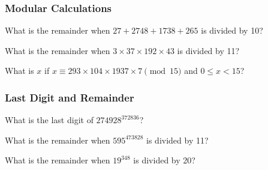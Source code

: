 			\subsubsection{Modular Calculations}
				\begin{problem} What is the remainder when $27+2748+1738+265$ is divided by 10? \end{problem}\vspace{0.5in}
				\begin{problem} What is the remainder when $3 \times 37 \times 192 \times 43$ is divided by 11? \end{problem}\vspace{0.5in}
				\begin{problem} What is $x$ if $x \equiv 293 \times 104 \times 1937 \times 7 \pmod{15}$ and $0 \leq x < 15$?\end{problem}\vspace{0.5in}
			\subsubsection{Last Digit and Remainder}
				\begin{problem} What is the last digit of $274928^{372836}$?\end{problem} \vspace{0.5in}
				\begin{problem} What is the remainder when $595^{473828}$ is divided by 11?\end{problem}\vspace{0.5in}
				\begin{problem} What is the remainder when $19^{348}$ is divided by 20?\end{problem}\vspace{0.5in}
